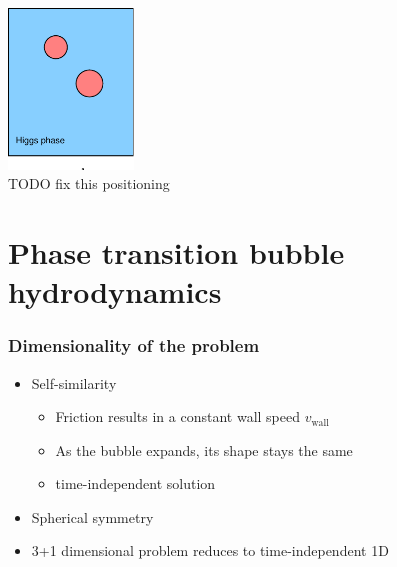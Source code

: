 \begin{frame}
\begin{minipage}[t]{0.48\linewidth}
        \includegraphics[width=0.25\textwidth]{../fig/HiggsBubble3.pdf} \\
        TODO fix this positioning
    \end{minipage}
\end{frame}

\section{Phase transition bubble hydrodynamics}

\begin{frame}
    \frametitle{Dimensionality of the problem}
    \begin{itemize}
        \item Self-similarity
        \begin{itemize}
            \item Friction results in a constant wall speed $v_\text{wall}$
            \item As the bubble expands, its shape stays the same
            \item \textrightarrow time-independent solution
        \end{itemize}
        \item Spherical symmetry
        \item 3+1 dimensional problem reduces to time-independent 1D
    \end{itemize}
\end{frame}

